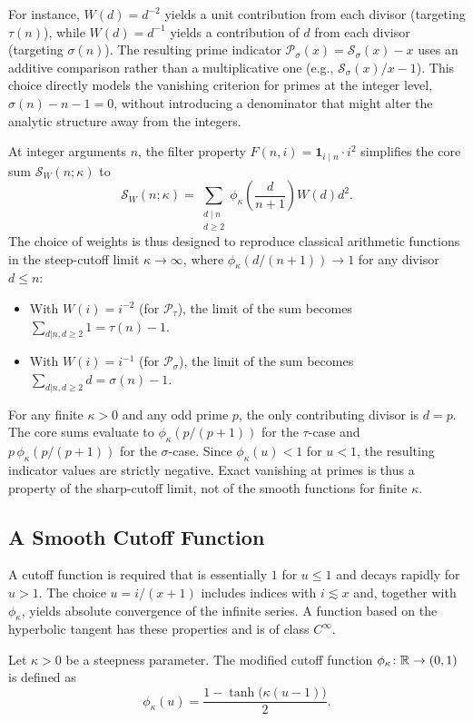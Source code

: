 For instance, $W(d)=d^{-2}$ yields a unit contribution from each divisor (targeting $\tau(n)$), while $W(d)=d^{-1}$ yields a contribution of $d$ from each divisor (targeting $\sigma(n)$). The resulting prime indicator $\mathcal{P}_\sigma(x) = \mathcal{S}_\sigma(x) - x$ uses an additive comparison rather than a multiplicative one (e.g., $\mathcal{S}_\sigma(x)/x - 1$). This choice directly models the vanishing criterion for primes at the integer level, $\sigma(n)-n-1=0$, without introducing a denominator that might alter the analytic structure away from the integers.

\begin{remark}\label{rem:integer-eval-smooth}
At integer arguments $n$, the filter property $F(n,i)=\mathbf{1}_{i \mid n} \cdot i^2$ simplifies the core sum $\mathcal{S}_W(n;\kappa)$ to
\[
\mathcal{S}_W(n;\kappa) = \sum_{\substack{d \mid n \\ d \ge 2}} \phi_{\kappa}\left(\frac{d}{n+1}\right) W(d) d^2.
\]
The choice of weights is thus designed to reproduce classical arithmetic functions in the steep-cutoff limit $\kappa\to\infty$, where $\phi_\kappa(d/(n+1))\to 1$ for any divisor $d\le n$:
\begin{itemize}
    \item With $W(i)=i^{-2}$ (for $\mathcal{P}_\tau$), the limit of the sum becomes $\sum_{d|n, d\ge2} 1 = \tau(n)-1$.
    \item With $W(i)=i^{-1}$ (for $\mathcal{P}_\sigma$), the limit of the sum becomes $\sum_{d|n, d\ge2} d = \sigma(n)-1$.
\end{itemize}
For any finite $\kappa>0$ and any odd prime $p$, the only contributing divisor is $d=p$. The core sums evaluate to $\phi_{\kappa}(p/(p+1))$ for the $\tau$-case and $p\,\phi_{\kappa}(p/(p+1))$ for the $\sigma$-case. Since $\phi_\kappa(u)<1$ for $u<1$, the resulting indicator values are strictly negative. Exact vanishing at primes is thus a property of the sharp-cutoff limit, not of the smooth functions for finite $\kappa$.
\end{remark}

\subsection{A Smooth Cutoff Function}
A cutoff function is required that is essentially $1$ for $u \le 1$ and decays rapidly for $u > 1$.
The choice $u=i/(x+1)$ includes indices with $i\lesssim x$ and, together with $\phi_\kappa$, yields absolute convergence of the infinite series.
A function based on the hyperbolic tangent has these properties and is of class $C^\infty$.
\begin{definition}
Let $\kappa>0$ be a steepness parameter. The modified cutoff function $\phi_{\kappa}\colon\mathbb{R}\to(0,1)$ is defined as
\begin{equation}\label{eq:phimod}
\phi_{\kappa}(u) = \frac{1 - \tanh\big(\kappa (u - 1)\big)}{2}.
\end{equation}
\end{definition}

